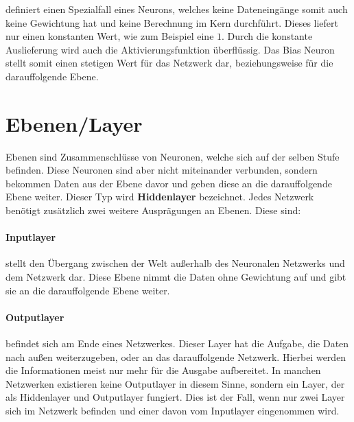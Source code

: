 definiert einen Spezialfall eines Neurons, welches keine Dateneingänge somit auch keine Gewichtung hat und keine Berechnung im Kern durchführt. 
Dieses liefert nur einen konstanten Wert, wie zum Beispiel eine $1$. 
Durch die konstante Auslieferung wird auch die Aktivierungsfunktion überflüssig. 
Das Bias Neuron stellt somit einen stetigen Wert für das Netzwerk dar, beziehungsweise für die darauffolgende Ebene.

\section{Ebenen/Layer}
\label{sec:Layer}

Ebenen sind Zusammenschlüsse von Neuronen, welche sich auf der selben Stufe befinden. 
Diese Neuronen sind aber nicht miteinander verbunden, sondern bekommen Daten aus der Ebene davor und geben diese an die darauffolgende Ebene weiter. 
Dieser Typ wird \textbf{Hiddenlayer} bezeichnet. 
Jedes Netzwerk benötigt zusätzlich zwei weitere Ausprägungen an Ebenen. 
Diese sind:

\paragraph{Inputlayer} stellt den Übergang zwischen der Welt außerhalb des Neuronalen Netzwerks und dem Netzwerk dar.
Diese Ebene nimmt die Daten ohne Gewichtung auf und gibt sie an die darauffolgende Ebene weiter. 

\paragraph{Outputlayer} befindet sich am Ende eines Netzwerkes. 
Dieser Layer hat die Aufgabe, die Daten nach außen weiterzugeben, oder an das darauffolgende Netzwerk. 
Hierbei werden die Informationen meist nur mehr für die Ausgabe aufbereitet. 
In manchen Netzwerken existieren keine Outputlayer in diesem Sinne, sondern ein Layer, der als Hiddenlayer und Outputlayer fungiert. 
Dies ist der Fall, wenn nur zwei Layer sich im Netzwerk befinden und einer davon vom Inputlayer eingenommen wird.
\\

